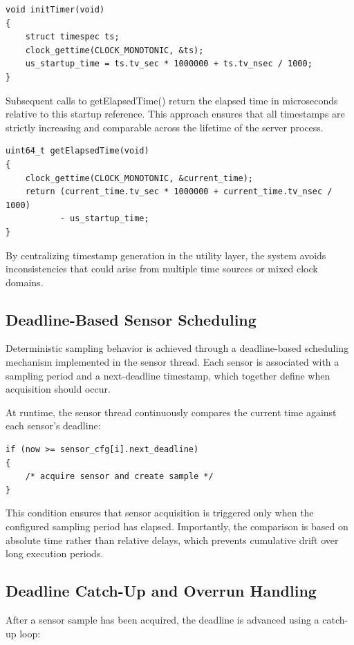 \begin{verbatim}
void initTimer(void)
{
    struct timespec ts;
    clock_gettime(CLOCK_MONOTONIC, &ts);
    us_startup_time = ts.tv_sec * 1000000 + ts.tv_nsec / 1000;
}
\end{verbatim}

Subsequent calls to getElapsedTime() return the elapsed time in microseconds relative to this startup reference. This approach ensures that all timestamps are strictly increasing and comparable across the lifetime of the server process.

\begin{verbatim}
uint64_t getElapsedTime(void)
{
    clock_gettime(CLOCK_MONOTONIC, &current_time);
    return (current_time.tv_sec * 1000000 + current_time.tv_nsec / 1000)
           - us_startup_time;
}
\end{verbatim}

By centralizing timestamp generation in the utility layer, the system avoids inconsistencies that could arise from multiple time sources or mixed clock domains.

\subsection{Deadline-Based Sensor Scheduling}
Deterministic sampling behavior is achieved through a deadline-based scheduling mechanism implemented in the sensor thread. Each sensor is associated with a sampling period and a next-deadline timestamp, which together define when acquisition should occur.

At runtime, the sensor thread continuously compares the current time against each sensor’s deadline:
\begin{verbatim}
if (now >= sensor_cfg[i].next_deadline)
{
    /* acquire sensor and create sample */
}
\end{verbatim}

This condition ensures that sensor acquisition is triggered only when the configured sampling period has elapsed. Importantly, the comparison is based on absolute time rather than relative delays, which prevents cumulative drift over long execution periods.

\subsection{Deadline Catch-Up and Overrun Handling}
After a sensor sample has been acquired, the deadline is advanced using a catch-up loop:

